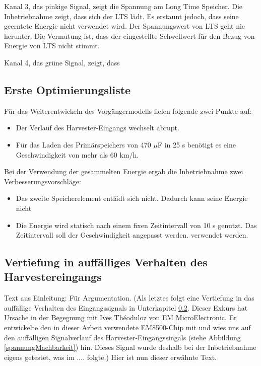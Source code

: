 Kanal 3, das pinkige Signal, zeigt die Spannung am Long Time Speicher. Die Inbetriebnahme zeigt, dass sich der LTS lädt. Es erstaunt jedoch, dass seine geerntete Energie nicht verwendet wird. Der Spannungswert von LTS geht nie herunter.
Die Vermutung ist, dass der eingestellte Schwellwert für den Bezug von Energie von LTS  nicht stimmt.

Kanal 4, das grüne Signal, zeigt, dass 


\subsection{Erste Optimierungsliste}\label{optimierung} 


Für das Weiterentwickeln des Vorgängermodells fielen folgende zwei Punkte auf:
\begin{itemize}
     \item Der Verlauf des Harvester-Eingangs wechselt abrupt.  
     \item Für das Laden des Primärspeichers von 470 $\mu$F in 25 s benötigt es eine Geschwindigkeit von mehr als 60 km/h. 
\end{itemize} 

Bei der Verwendung der gesammelten Energie ergab die Inbetriebnahme zwei Verbesserungsvorschläge:

\begin{itemize}
     
     \item Das zweite Speicherelement entlädt sich nicht. Dadurch kann seine Energie nicht
     \item Die Energie wird statisch nach einem fixen Zeitintervall von 10 s genutzt. Das Zeitintervall soll der Geschwindigkeit angepasst werden.  verwendet werden.
\end{itemize} 


\subsection{Vertiefung in auffälliges Verhalten des Harvestereingangs}\label{auffaellig} 


Text aus Einleitung: Für Argumentation. (Als letztes folgt eine Vertiefung in das auffällige Verhalten des Eingangssignals in Unterkapitel \ref{auffaellig}. Dieser Exkurs hat Ursache in der Begegnung mit  Ives Théoduloz von EM MicroElectronic. Er entwickelte den in dieser Arbeit verwendete EM8500-Chip mit und wies uns auf den auffälligen Signalverlauf des Harvester-Eingangssingals (siehe Abbildung \ref{spannungMachbarkeit}) hin. Dieses Signal wurde deshalb bei der Inbetriebnahme eigens getestet, was im .... folgte.) Hier ist nun dieser erwähnte Text.

